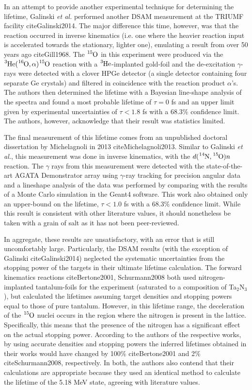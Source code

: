 In an attempt to provide another experimental technique for determining the lifetime, Galinski \textit{et al.} performed another DSAM measurement at the TRIUMF facility cite{Galinski2014}. The major difference this time, however, was that the reaction occurred in inverse kinematics (i.e. one where the heavier reaction input is accelerated towards the stationary, lighter one), emulating a result from over 50 years ago cite{Gill1968}. The $\ce{^{15}O}$ in this experiment were produced via the $\ce{^{3}He}(\ce{^{16}O},\alpha)\ce{^{15}O}$ reaction with a $\ce{^{3}He}$-implanted gold-foil and the de-excitation $\gamma$-rays were detected with a clover HPGe detector (a single detector containing four separate Ge crystals) and filtered in coincidence with the reaction product $\alpha$'s. The authors then determined the lifetime with a Bayesian line-shape analysis of the spectra and found a most probable lifetime of $\tau = 0$ fs and an upper limit given by experimental uncertainties of $\tau < 1.8$ fs with a 68.3\% confidence limit. The authors, however, acknowledge that their result was statistics limited.

The final measurement of this lifetime comes from an unpublished doctoral dissertation by Michelagnoli in 2013 cite{Michelagnoli2013}. Similar to Galinski \textit{et al.}, this measurement was done in inverse kinematics, with the $d(\ce{^{14}N},\ce{^{15}O})n$ reaction. The $\gamma$ rays from this measurement were detected with the state-of-the-art AGATA Demonstrator array using $\gamma$-ray tracking for precision angular data and a lineshape analysis of the data was performed by comparing with the results of a Monte Carlo simulation in the Geant4 software. This work also obtained only an upper-bound on the lifetime, $\tau < 1.0$ fs with a 68.3\% confidence limit. While this result is consistent with other literature values, it should nonetheless be taken with a grain of salt as it has not been peer-reviewed. 

In aggregate, these results are unsatisfactory, with an error that is still uncomfortably large. Particularly, the DSAM results (with the exception of Galinski cite{Galinski2014}) neglected the systematic uncertainties from the stopping power of the targets in their ultimate lifetime calculation. The forward kinematics reactions cite{Bertone2001, Schurmann2008} both used nitrogen-implanted tantalum-foils for the experiment (saturated to a composition of Ta$_{2}$N$_{3}$), but calculated the lifetimes assuming target densities and stopping powers equal to those of pure tantalum. However, in this lifetime range, the deceleration of the $\ce{^{15}O}$ nuclei occurs in the region where the nitrogen is present in the lattice. Specifically, this means that the presence of the nitrogen has a significant effect on the actual stopping power. According to the authors of the respective works, by using accurate densities and stopping powers the inferred lifetimes obtained in their works would have changed by 100\% cite{Bertone2001} and 2\% cite{Schurmann2008}, respectively. In both, the authors also contend that their calculations are appropriate because they used an identical method to calculate the lifetime of the 5.18 MeV state, agreeing with literature values.



